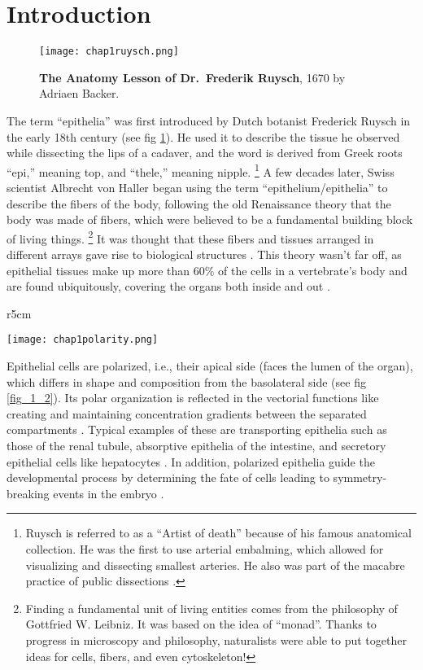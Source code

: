 

\hypertarget{introduction}{%
	\section{Introduction}\label{introduction}}

\begin{figure}[h!]
	\centering
	\texttt{[image: chap1ruysch.png]}
	\caption{\label{fig_1_1} \textbf{The Anatomy Lesson of Dr.~Frederik Ruysch}, 1670 by
		Adriaen Backer.}
\end{figure}

The term ``epithelia'' was first introduced by Dutch botanist Frederick Ruysch in the early 18th century (see fig \ref{fig_1_1}). He used it to describe the tissue he observed while dissecting the lips of a cadaver, and the word is derived from Greek roots ``epi,'' meaning top, and ``thele,'' meaning nipple.
\footnote{Ruysch is referred to as a ``Artist of death'' because of his famous anatomical collection. He was the first to use arterial embalming, which allowed for visualizing and dissecting smallest
	arteries. He also was part of the macabre practice of public dissections \cite{halley2019}.}
A few decades later, Swiss scientist Albrecht von Haller began using the term ``epithelium/epithelia'' to describe the fibers of the body, following the old Renaissance theory that the body was made of fibers, which were believed to be a fundamental building block of living things.
\footnote{Finding a fundamental unit of living entities comes from the philosophy of Gottfried W. Leibniz. It was based on the idea of ``monad''. Thanks to progress in microscopy and philosophy, naturalists were able to put together ideas for cells, fibers, and even cytoskeleton!\cite{zampieri2014}}
It was thought that these fibers and tissues arranged in different arrays gave rise to biological structures \cite{maccord2012, zampieri2014}. This theory wasn't far off, as epithelial tissues make up more than 60\% of the cells in a vertebrate's body and are found ubiquitously, covering the organs both inside and out \cite{alberts2015}.

\begin{wrapfigure}{r}{5cm}
	\caption{\textbf{Polarity of epithelia} Actin and myosin is distributed heterogenously in epithelial monolayers \cite{chen2018}.}\label{fig_1_2}
	\centering
	\texttt{[image: chap1polarity.png]}
\end{wrapfigure}

Epithelial cells are polarized, i.e., their apical side (faces the lumen of the organ), which differs in shape and composition from the basolateral side (see fig \ref{fig_1_2}). Its polar organization is reflected in the vectorial functions like creating and maintaining concentration gradients between the separated compartments \cite{marchiando2010}. Typical examples of these are transporting epithelia such as those of the renal tubule, absorptive epithelia of the intestine, and secretory epithelial cells like hepatocytes \cite{alberts2015}. In addition, polarized epithelia guide the developmental process by determining the fate of cells leading to symmetry-breaking events in the embryo \cite{kim2018}.

